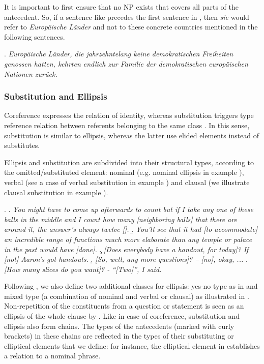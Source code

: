 \documentclass[a4paper]{article}
\begin{document}
{{It is important to first ensure that no NP exists that covers all parts of the antecedent. So, if a sentence like \Next precedes the first sentence in \Last[b], then {\sl sie} would refer to {\sl Europäische Länder} and not to these concrete countries mentioned in the following sentences.

\ex.
{\sl Europäische Länder, die jahrzehntelang keine demokratischen Freiheiten genossen hatten, kehrten endlich zur Familie der demokratischen europäischen Nationen zurück.}


\subsubsection{Substitution and Ellipsis}\label{sec:substitution}
Coreference expresses the relation of identity, whereas substitution triggers type reference relation between referents belonging to the same class \cite{KunzSteiner2013,deBeaugrandeDressler1981}. In this sense,
substitution is similar to ellipsis, whereas the latter use elided elements
instead of substitutes.

Ellipsis and substitution are subdivided into their structural types,
according to the omitted/substituted element: nominal (e.g. nominal
ellipsis in example \Next[a]), verbal (see a case of verbal substitution in
example \Next[b]) and clausal (we illustrate clausal substitution in example
\Next[c]).

\ex.
\a. {\sl You might have to come up afterwards to count but if I take
any one of these balls in the middle and I count how many
[neighboring balls] that there are around it, the answer's
always twelve [].}
\b. {\sl You'll see that it had [to accommodate] an incredible range
of functions much more elaborate than any temple or palace in
the past would have [done].}
\c. {\sl [Does everybody have a handout, for today]? If [not]
Aaron's got handouts.}
\d. {\sl [So, well, any more questions]? -- [no], okay, ...}
\e. {\sl [How many slices do you want]? - ``[Two]'', I said.}

Following \cite{Menzel2017}, we also define two additional classes for
ellipsis: yes-no type as in \Last[d] and mixed type (a combination of nominal
and verbal or clausal) as illustrated in \Last[e]. Non-repetition of the
constituents from a question or statement is seen as an ellipsis of the whole clause by \cite{HallidayHasan1976}. Like in case of coreference,
substitution and ellipsis also form chains. The types of the antecedents
(marked with curly brackets) in these chains are reflected in the types of
their substituting or elliptical elements that we define: for instance, the
elliptical element in \Last[a] establishes a relation to a nominal phrase.

}}
\end{document}
